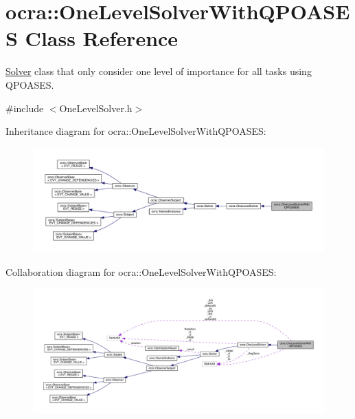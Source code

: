 \hypertarget{classocra_1_1OneLevelSolverWithQPOASES}{}\section{ocra\+:\+:One\+Level\+Solver\+With\+Q\+P\+O\+A\+S\+ES Class Reference}
\label{classocra_1_1OneLevelSolverWithQPOASES}


\hyperlink{classocra_1_1Solver}{Solver} class that only consider one level of importance for all tasks using Q\+P\+O\+A\+S\+ES.  




{\ttfamily \#include $<$One\+Level\+Solver.\+h$>$}



Inheritance diagram for ocra\+:\+:One\+Level\+Solver\+With\+Q\+P\+O\+A\+S\+ES\+:\nopagebreak
\begin{figure}[H]
\begin{center}
\leavevmode
\includegraphics[width=350pt]{d1/dbe/classocra_1_1OneLevelSolverWithQPOASES__inherit__graph}
\end{center}
\end{figure}


Collaboration diagram for ocra\+:\+:One\+Level\+Solver\+With\+Q\+P\+O\+A\+S\+ES\+:\nopagebreak
\begin{figure}[H]
\begin{center}
\leavevmode
\includegraphics[width=350pt]{db/d99/classocra_1_1OneLevelSolverWithQPOASES__coll__graph}
\end{center}
\end{figure}
